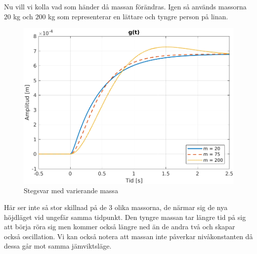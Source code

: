 \newpage
Nu vill vi kolla vad som händer då massan förändras. Igen så används massorna $20$ kg och $200$ kg som representerar en lättare och tyngre person på linan.
\begin{figure}[H]
    \centering
    \includegraphics[scale=0.9]{bilder/stegsvar_variation_m}
    \caption{Stegsvar med varierande massa}
    \label{fig:stegsvar_variation_m}
\end{figure}
Här ser inte så stor skillnad på de 3 olika massorna, de närmar sig de nya höjdläget vid ungefär samma tidpunkt. Den tyngre massan tar längre tid på sig att börja röra sig men kommer också längre ned än de andra två och skapar också oscillation.
Vi kan också notera att massan inte påverkar nivåkonstanten då dessa går mot samma jämviktsläge.


